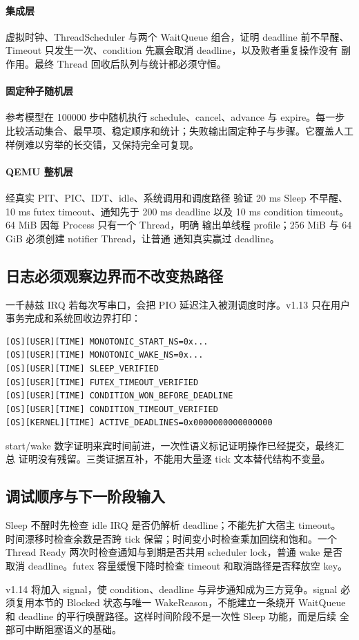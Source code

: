 \paragraph{集成层}
虚拟时钟、ThreadScheduler 与两个 WaitQueue 组合，证明 deadline 前不早醒、
Timeout 只发生一次、condition 先赢会取消 deadline，以及败者重复操作没有
副作用。最终 Thread 回收后队列与统计都必须守恒。

\paragraph{固定种子随机层}
参考模型在 100000 步中随机执行 schedule、cancel、advance 与 expire。每一步
比较活动集合、最早项、稳定顺序和统计；失败输出固定种子与步骤。它覆盖人工
样例难以穷举的长交错，又保持完全可复现。

\paragraph{QEMU 整机层}
 经真实 PIT、PIC、IDT、idle、系统调用和调度路径
验证 20 ms Sleep 不早醒、10 ms futex timeout、通知先于 200 ms deadline
以及 10 ms condition timeout。64 MiB 因每 Process 只有一个 Thread，明确
输出单线程 profile；256 MiB 与 64 GiB 必须创建 notifier Thread，让普通
通知真实赢过 deadline。

\subsection{日志必须观察边界而不改变热路径}

一千赫兹 IRQ 若每次写串口，会把 PIO 延迟注入被测调度时序。v1.13 只在用户
事务完成和系统回收边界打印：

\begin{lstlisting}
[OS][USER][TIME] MONOTONIC_START_NS=0x...
[OS][USER][TIME] MONOTONIC_WAKE_NS=0x...
[OS][USER][TIME] SLEEP_VERIFIED
[OS][USER][TIME] FUTEX_TIMEOUT_VERIFIED
[OS][USER][TIME] CONDITION_WON_BEFORE_DEADLINE
[OS][USER][TIME] CONDITION_TIMEOUT_VERIFIED
[OS][KERNEL][TIME] ACTIVE_DEADLINES=0x0000000000000000
\end{lstlisting}

start/wake 数字证明来宾时间前进，一次性语义标记证明操作已经提交，最终汇总
证明没有残留。三类证据互补，不能用大量逐 tick 文本替代结构不变量。

\subsection{调试顺序与下一阶段输入}

Sleep 不醒时先检查 idle IRQ 是否仍解析 deadline；不能先扩大宿主 timeout。
时间漂移时检查余数是否跨 tick 保留；时间变小时检查乘加回绕和饱和。一个
Thread Ready 两次时检查通知与到期是否共用 scheduler lock，普通 wake 是否
取消 deadline。futex 容量缓慢下降时检查 timeout 和取消路径是否释放空 key。

v1.14 将加入 signal，使 condition、deadline 与异步通知成为三方竞争。signal
必须复用本节的 Blocked 状态与唯一 WakeReason，不能建立一条绕开 WaitQueue
和 deadline 的平行唤醒路径。这样时间阶段不是一次性 Sleep 功能，而是后续
全部可中断阻塞语义的基础。

